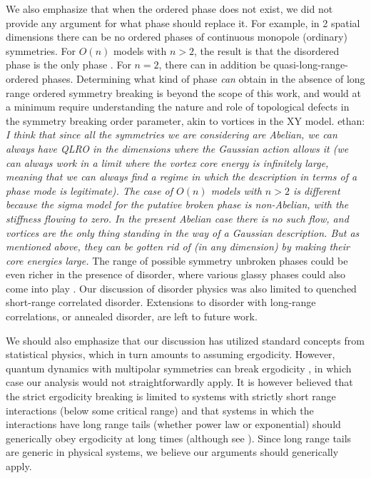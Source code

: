 \documentclass[pra,aps,twocolumn, amsfonts,amsmath,amssymb,nofootinbib,superscriptaddress]{revtex4-2}
\newcommand{\ethan}[1]{ { \color{blue} \footnotesize \textsf{ethan: \textsl{#1}} }}
\begin{document}
We also emphasize that when the ordered phase does not exist, we did not provide any argument for what phase should replace it. For example, in 2 spatial dimensions there can be no ordered phases of continuous monopole (ordinary) symmetries. For $O(n)$ models with $n>2$, the result is that the disordered phase is the only phase \cite{polyakov}. For $n=2$, there can in addition be quasi-long-range-ordered phases. Determining what kind of phase {\it can} obtain in the absence of long range ordered symmetry breaking is beyond the scope of this work, and would at a minimum require understanding the nature and role of topological defects in the symmetry breaking order parameter, akin to vortices in the XY model. \ethan{I think that since all the symmetries we are considering are Abelian, we can always have QLRO in the dimensions where the Gaussian action allows it (we can always work in a limit where the vortex core energy is infinitely large, meaning that we can always find a regime in which the description in terms of a phase mode is legitimate). The case of $O(n)$ models with $n>2$ is different because the sigma model for the putative broken phase is non-Abelian, with the stiffness flowing to zero. In the present Abelian case there is no such flow, and vortices are the only thing standing in the way of a Gaussian description. But as mentioned above, they can be gotten rid of (in any dimension) by making their core energies large.} The range of possible symmetry unbroken phases could be even richer in the presence of disorder, where various glassy phases could also come into play \cite{Fisheretal}. Our discussion of disorder physics was also limited to quenched short-range correlated disorder. Extensions to disorder with long-range correlations, or annealed disorder, are left to future work.

We should also emphasize that our discussion has utilized standard concepts from statistical physics, which in turn amounts to assuming ergodicity. However, quantum dynamics with multipolar symmetries can break ergodicity \cite{KHN, Sala}, in which case our analysis would not straightforwardly apply. It is however believed that the strict ergodicity breaking is limited to systems with strictly short range interactions (below some critical range) and that systems in which the interactions have long range tails (whether power law or exponential) should generically obey ergodicity at long times (although see \cite{NS}). Since long range tails are generic in physical systems, we believe our arguments should generically apply.  
\end{document}
